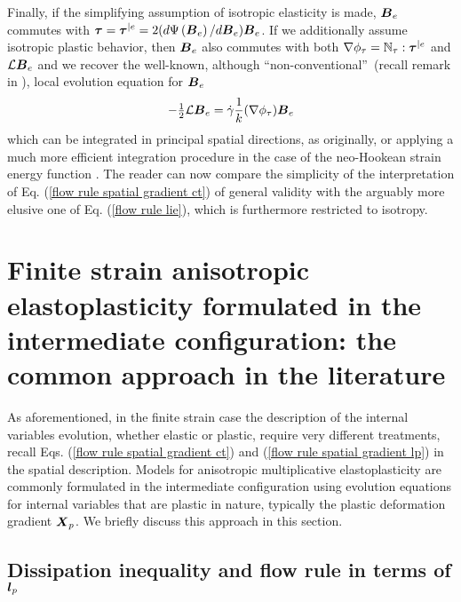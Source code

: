\documentclass[preprint,review,12pt,sort&compress]{elsarticle}%
\renewcommand{\mathbf}[1]{\mbox{\boldmath $#1$ \unboldmath}  \!\!}
\begin{document}
Finally, if the simplifying assumption of isotropic elasticity is made,
$\mathbf{B}_{e}$ commutes with $\mathbf{\tau}=\mathbf{\tau}^{|e}%
=2(d\Psi\left(  \mathbf{B}_{e}\right)  /d\mathbf{B}_{e})\mathbf{B}_{e}$. If we
additionally assume isotropic plastic behavior, then $\mathbf{B}_{e}$ also
commutes with both $\mathbb{\nabla}\phi_{\tau}=\mathbb{N}_{\tau}:\mathbf{\tau
}^{|e}$ and $\mathcal{L}\mathbf{B}_{e}$ and we recover the well-known,
although \textquotedblleft non-conventional\textquotedblright\ (recall remark
in \cite{Simo92}), local evolution equation for $\mathbf{B}_{e}$
\cite{SimoMiehe92}%
\begin{equation}
-\tfrac{1}{2}\mathcal{L}\mathbf{B}_{e}=\dot{\gamma}\frac{1}{k}(\mathbb{\nabla
}\phi_{\tau})\mathbf{B}_{e} \label{flow rule lie}%
\end{equation}
which can be integrated in principal spatial directions, as originally, or
applying a much more efficient integration procedure in the case of the
neo-Hookean strain energy function \cite{ShuLanIhl13}. The reader can now
compare the simplicity of the interpretation of Eq.
(\ref{flow rule spatial gradient ct}) of general validity with the arguably
more elusive one of Eq. (\ref{flow rule lie}), which is furthermore restricted
to isotropy.

\section{Finite strain anisotropic elastoplasticity formulated in the
intermediate configuration: the common approach in the literature}

As aforementioned, in the finite strain case the description of the internal
variables evolution, whether elastic or plastic, require very different
treatments, recall Eqs. (\ref{flow rule spatial gradient ct}) and
(\ref{flow rule spatial gradient lp}) in the spatial description. Models for
anisotropic multiplicative elastoplasticity are commonly formulated in the
intermediate configuration using evolution equations for internal variables
that are plastic in nature, typically the plastic deformation gradient
$\mathbf{X}_{p}$. We briefly discuss this approach in this section.

\subsection{Dissipation inequality and flow rule in terms of $\mathbf{l}_{p}$}
\end{document}
